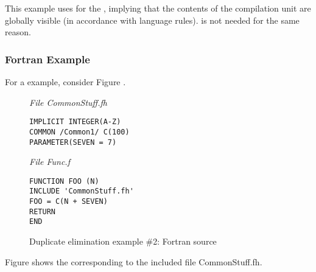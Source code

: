 This example uses  
for the ,
implying that the contents of the compilation unit are
globally visible (in accordance with 
 language rules).
is not needed for the same reason.

\subsubsection{Fortran Example}


For a 
example, consider 
Figure .

\begin{figure}
\textit{File CommonStuff.f\hspace{1pt}h}
\begin{lstlisting}[numbers=none]
IMPLICIT INTEGER(A-Z)
COMMON /Common1/ C(100)
PARAMETER(SEVEN = 7)
\end{lstlisting}

\textit{File Func.f}
\begin{lstlisting}[numbers=none]
FUNCTION FOO (N)
INCLUDE 'CommonStuff.fh'
FOO = C(N + SEVEN)
RETURN
END
\end{lstlisting}
\caption{Duplicate elimination example \#2: Fortran source} 
\label{fig:duplicateeliminationexample2fortransource}
\end{figure}


Figure 
shows the 
corresponding to the included file 
CommonStuff.fh.

